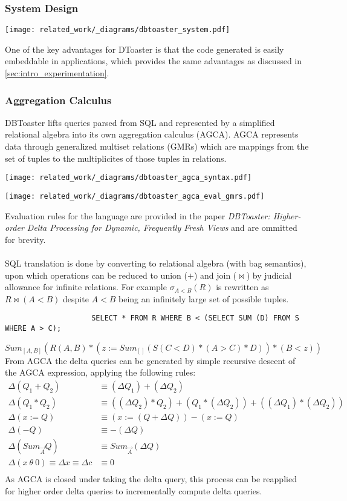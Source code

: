 \subsubsection{System Design}
\begin{center}
    \texttt{[image: related\_work/\_diagrams/dbtoaster\_system.pdf]}
\end{center}
One of the key advantages for DToaster is that the code generated is easily embeddable in applications, which provides the same advantages as discussed in \ref{sec:intro_experimentation}.

\subsubsection{Aggregation Calculus}
DBToaster lifts queries parsed from SQL and represented by a simplified relational algebra into its own aggregation calculus (AGCA). AGCA represents data through generalized multiset relations (GMRs) which are mappings from the set of tuples to the multiplicites of those tuples in relations.
\begin{center}
    \texttt{[image: related\_work/\_diagrams/dbtoaster\_agca\_syntax.pdf]}
\end{center}
\begin{center}
    \texttt{[image: related\_work/\_diagrams/dbtoaster\_agca\_eval\_gmrs.pdf]}
\end{center}
Evaluation rules for the language are provided in the paper \textit{DBToaster: Higher-order Delta Processing for Dynamic, Frequently Fresh Views}\cite{DBToasterHigherOrderDeltaProcessing} and are ommitted for brevity.
\\
\\ SQL translation is done by converting to relational algebra (with bag semantics), upon which operations can be reduced to union ($+$) and join ($\bowtie$) by judicial allowance for infinite relations. For example $\sigma_{A<B}(R)$ is rewritten as $R \bowtie (A < B)$ despite $A < B$ being an infinitely large set of possible tuples.
\begin{verbatim}
                    SELECT * FROM R WHERE B < (SELECT SUM (D) FROM S WHERE A > C);
\end{verbatim}
\[Sum_{[A,B]}(R(A,B) \ast (z := Sum_{[]}(S(C<D) \ast (A > C) \ast D)) \ast (B < z))\]
From AGCA the delta queries can be generated by simple recursive descent of the AGCA expression, applying the following rules:
\[
    \begin{split}
        \Delta(Q_1 + Q_2) & \equiv (\Delta Q_1) + (\Delta Q_2) \\
        \Delta(Q_1 \ast Q_2) & \equiv ((\Delta Q_2) \ast Q_2) + (Q_1 \ast (\Delta Q_2)) + ((\Delta Q_1) \ast (\Delta Q_2)) \\
        \Delta (x := Q) & \equiv (x := (Q + \Delta Q)) - (x := Q) \\
        \Delta (-Q) & \equiv - (\Delta Q) \\
        \Delta(Sum_{\overrightarrow{A}}Q) & \equiv Sum_{\overrightarrow{A}}(\Delta Q) \\
        \Delta ( x \ \theta \ 0) \equiv \Delta x \equiv \Delta c & \equiv 0 \\
    \end{split}
\]
As AGCA is closed under taking the delta query, this process can be reapplied for higher order delta queries to incrementally compute delta queries.
